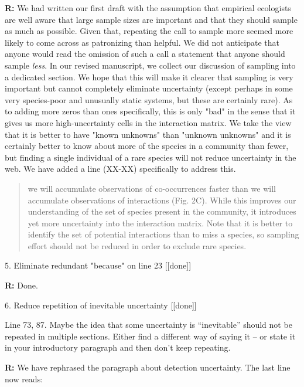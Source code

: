 \documentclass[12pt]{letter}
\newenvironment{refquote}{\bigskip \begin{it}}{\end{it}\smallskip}
\begin{document}
		\textbf{R:} We had written our first draft with the assumption that empirical ecologists are well aware that large sample sizes are important and that they should sample as much as possible. Given that, repeating the call to sample more seemed more likely to come across as patronizing than helpful. We did not anticipate that anyone would read the omission of such a call a statement that anyone should sample \emph{less}. In our revised manuscript, we collect our discussion of sampling into a dedicated section. We hope that this will make it clearer that sampling is very important but cannot completely eliminate uncertainty (except perhaps in some very species-poor and unusually static systems, but these are certainly rare). As to adding more zeros than ones specifically, this is only "bad" in the sense that it gives us more high-uncertainty cells in the interaction matrix. We take the view that it is better to have "known unknowns" than "unknown unknowns" and it is certainly better to know about more of the species in a community than fewer, but finding a single individual of a rare species will not reduce uncertainty in the web. We have added a line (XX-XX) specifically to address this.

		\begin{quotation}
			we will accumulate observations of co-occurrences faster than we will accumulate observations of interactions (Fig. 2C). While this improves our understanding of the set of species present in the community, it introduces yet more uncertainty into the interaction matrix. Note that it is better to identify the set of potential interactions than to miss a species, so sampling effort should not be reduced in order to exclude rare species.
		\end{quotation}


	5. Eliminate redundant "because" on line 23 [[done]]

		\textbf{R:} Done.


	6. Reduce repetition of inevitable uncertainty [[done]]

		\begin{refquote}
		Line 73, 87.  Maybe the idea that some uncertainty is “inevitable” should not be repeated in multiple sections.  Either find a different way of saying it – or state it in your introductory paragraph and then don’t keep repeating.
		\end{refquote}

		\textbf{R:} We have rephrased the paragraph about detection uncertainty. The last line now reads:
			
\end{document}
